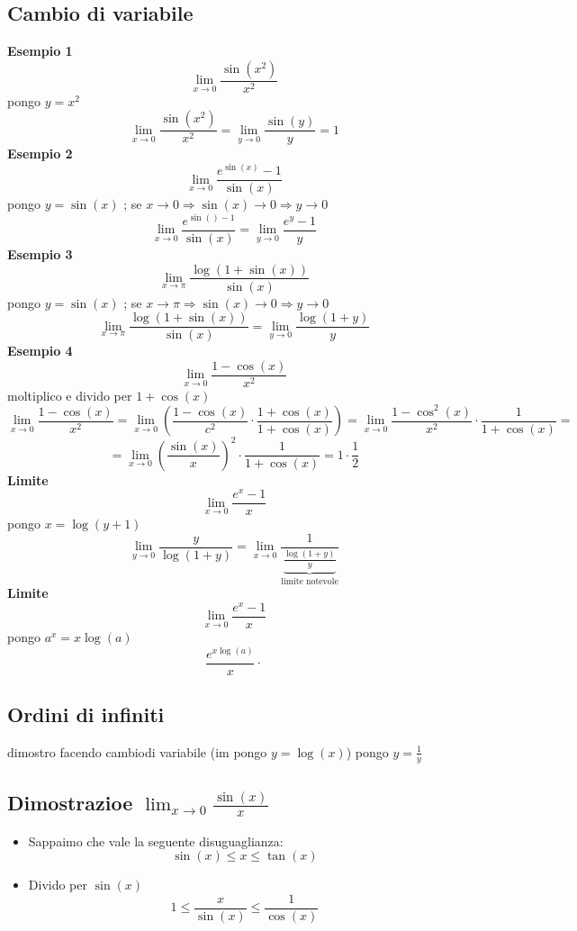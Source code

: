 \subsection{Cambio di variabile}
\textbf{Esempio 1}
\[
	\lim_{x \to 0} \frac{\sin\left( x^2 \right) }{x^2}
\]
pongo $y=x^2$
\[
	\lim_{x \to 0} \frac{\sin\left( x^2 \right) }{x^2}= \lim_{y \to 0} \frac{\sin\left( y \right) }{y}= 1
\]
\textbf{Esempio 2}
\[
	\lim_{x \to  0} \frac{e^{\sin\left( x \right) }-1}{\sin\left( x \right) }
\]
pongo $y=\sin\left( x \right) $ ; se $x \to 0 \Rightarrow \sin\left( x \right) \to 0 \Rightarrow y \to 0$
\[
	\lim_{x \to 0} \frac{e^{\sin\left(  \right) -1}}{\sin\left( x \right) }= \lim_{y \to 0} \frac{e^{y}-1}{y}
\]
\textbf{Esempio 3}
\[
	\lim_{x \to \pi } \frac{\log\left( 1+\sin\left( x \right)  \right) }{\sin\left( x \right) }
\]
pongo $y=\sin\left( x \right) $ ; se $x \to \pi \Rightarrow \sin\left( x \right) \to 0 \Rightarrow y \to 0$
\[
	\lim_{x \to \pi } \frac{\log\left( 1+\sin\left( x \right)  \right) }{\sin\left( x \right) } = \lim_{y \to 0} \frac{\log \left( 1+y \right) }{y}
\]
\textbf{Esempio 4}
\[
	\lim_{x \to 0} \frac{1-\cos\left( x \right) }{x^2}
\]
moltiplico e divido per $1+\cos\left( x \right) $
\[
	\lim_{x \to 0} \frac{1-\cos\left( x \right) }{x^2} = \lim_{x \to 0} \left(\frac{1-\cos\left( x \right) }{c^2} \cdot \frac{1+ \cos \left( x \right) }{1 + \cos \left( x \right) } \right) = \lim_{x \to 0} \frac{1-\cos ^2 \left( x \right) }{x^2} \cdot \frac{1}{1+\cos\left( x \right) }  =
\]
\[
	=\lim_{x \to 0} \left( \frac{\sin \left( x \right) }{x} \right) ^2 \cdot \frac{1}{1+\cos\left( x \right) } = 1 \cdot \frac{1}{2}
\]
\textbf{Limite}
\[
	\lim_{x \to 0} \frac{e^{x} -1}{x}
\]
pongo $ x = \log \left( y+1 \right) $
\[
	\lim_{y \to 0} \frac{y}{\log \left( 1+y \right) }  = \lim_{x \to 0} \frac{1}{\underbrace{\frac{\log\left( 1+ y\right) }{y}}_{\text{limite notevole}}}
\]
\textbf{Limite}
\[
	\lim_{x \to 0} \frac{e^{x}-1}{x}
\]
pongo $a^{x}=x \log \left( a \right) $
\[
	\frac{e^{x \log \left( a \right)  }}{x} \cdot
\]
\subsection{Ordini di infiniti}
\bigbox{
	\[
		\lim_{x \to \infty} \frac{\left( \log \left( x \right)  \right) ^{a}}{x^{b}}=0 \quad \forall e>0, b>0
	\]
}
dimostro facendo cambiodi variabile (im pongo $y= \log \left( x \right) $)
\bigbox{
	\[
		\lim_{x \to 0^{+}} x \log \left( x \right) = 0
	\]
}
pongo $y=\frac{1}{y}$

\subsection{Dimostrazioe $\lim_{x \to 0} \frac{\sin\left( x \right) }{x} $}
\begin{itemize}
	\item Sappaimo che vale la seguente disuguaglianza:
	      \[
		      \sin \left( x \right) \le x \le \tan \left( x \right)
	      \]
	\item Divido per $\sin\left( x \right) $
	      \[
		      1 \le \frac{x}{\sin\left( x \right) }\le \frac{1}{\cos\left( x \right) }
	      \]
\end{itemize}
